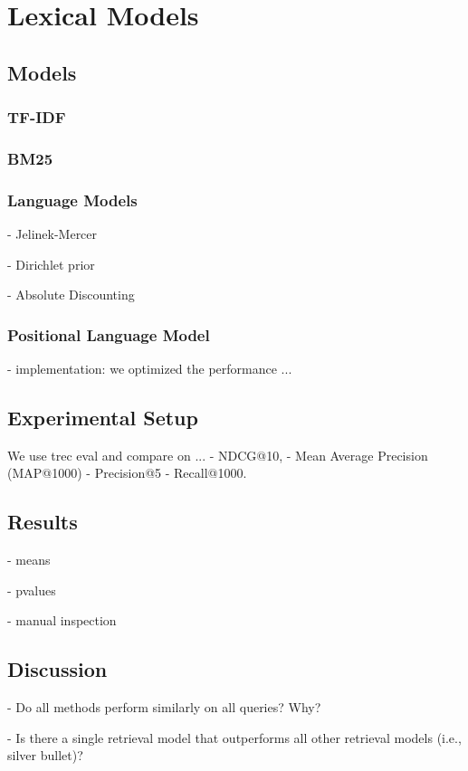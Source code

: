 \section{Lexical Models}

\subsection{Models}


\subsubsection{TF-IDF}

\subsubsection{BM25}

\subsubsection{Language Models}

- Jelinek-Mercer

- Dirichlet prior

- Absolute Discounting

\subsubsection{Positional Language Model}

- implementation: we optimized the performance ...


\subsection{Experimental Setup}



We use trec eval and compare on ...
- NDCG@10, 
- Mean Average Precision (MAP@1000) 
- Precision@5
- Recall@1000.

\subsection{Results}

- means



- pvalues

- manual inspection

\subsection{Discussion}

- Do all methods perform similarly on all queries? Why?

- Is there a single retrieval model that outperforms all other retrieval models (i.e., silver bullet)?